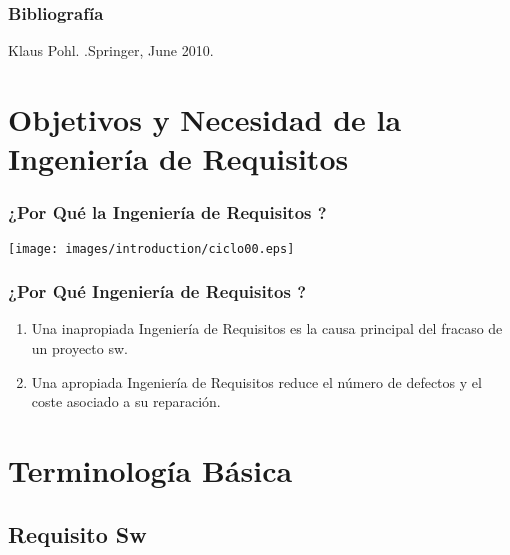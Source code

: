 \documentclass[handout,a4paper,slidestop,xcolor=pst,dvips,blue]{beamer}
\begin{document}
\begin{frame}[c]
    \frametitle{Bibliografía}
    \begin{thebibliography}{1}
         Klaus Pohl. .\newblock Springer, June 2010.
    \end{thebibliography}
\end{frame}

\section{Objetivos y Necesidad de la Ingeniería de Requisitos}

\begin{frame}
    \frametitle{¿Por Qué la Ingeniería de Requisitos ?}
    \begin{center}
        \texttt{[image: images/introduction/ciclo00.eps]}
    \end{center}
\end{frame}

\begin{frame}[c]
    \frametitle{¿Por Qué Ingeniería de Requisitos ?}
    \begin{enumerate}[<+->]
        \item Una inapropiada Ingeniería de Requisitos es la causa principal del fracaso de un proyecto sw.
        \item Una apropiada Ingeniería de Requisitos reduce el número de defectos y el coste asociado a su reparación.
    \end{enumerate}
\end{frame}

\section{Terminología Básica}

\subsection{Requisito Sw}
\end{document}
